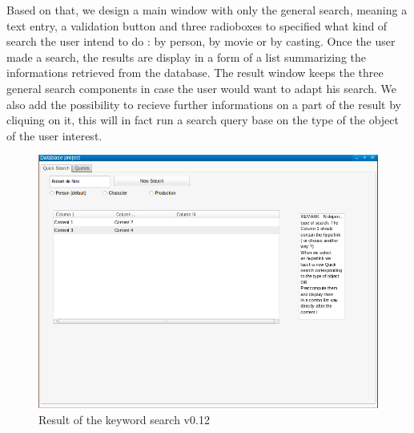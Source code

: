\documentclass{article}
\begin{document}
Based on that, we design a main window with only the general search, meaning a text entry, a validation button and three radioboxes to specified what kind of search the user intend to do : by person, by movie or by casting. Once the user made a search, the results are display in a form of a list summarizing the informations retrieved from the database. The result window keeps the three general search components in case the user would want to adapt his search. We also add the possibility to recieve further informations on a part of the result by cliquing on it, this will in fact run a search query base on the type of the object of the user interest.\\

\begin{figure}[H]
        \includegraphics[width=\linewidth]{result_quick.png}
        \captionsetup{justification=centering}
        \caption{Result of the keyword search v0.12}
    \end{figure}
\end{document}
